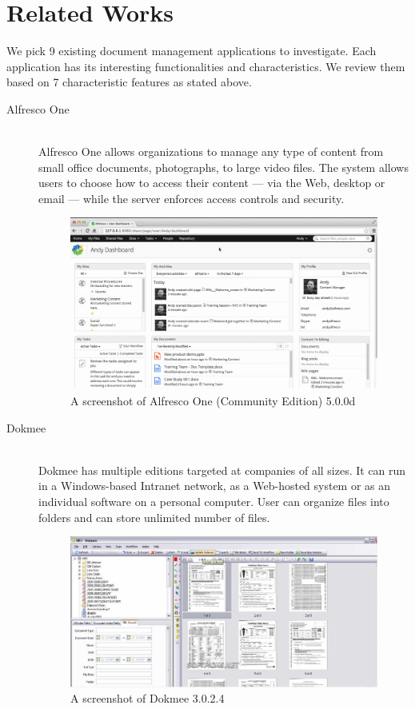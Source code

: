 \section{Related Works} \label{relate-works}
We pick 9 existing document management applications to investigate.
Each application has its interesting functionalities and characteristics.
We review them based on 7 characteristic features as stated above.

\begin{description}
\item[Alfresco One] \hfill \\
Alfresco One allows organizations to manage any type of content from small office documents, photographs, to large video files.
The system allows users to choose how to access their content --- via the Web, desktop or email --- while the server enforces access controls and security.
\begin{figure}[h]
	\centering
	\includegraphics[scale=0.4]{res/literature/screenshot_alfresco}
	\caption{A screenshot of Alfresco One (Community Edition) 5.0.0d }
\end{figure}

\item[Dokmee] \hfill \\
Dokmee has multiple editions targeted at companies of all sizes.
It can run in a Windows-based Intranet network, as a Web-hosted system or as an individual software on a personal computer.
User can organize files into folders and can store unlimited number of files.
\begin{figure}[h]
	\centering
	\includegraphics[scale=0.55]{res/literature/screenshot_dokmee}
	\caption{A screenshot of Dokmee 3.0.2.4 }
\end{figure}


\end{description}
